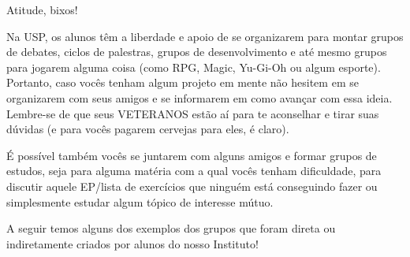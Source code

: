 \begin{secao}{Atitude, bixos!}

Na USP, os alunos têm a liberdade e apoio de se organizarem
para montar grupos de debates, ciclos de palestras, grupos
de desenvolvimento e até mesmo grupos para jogarem alguma coisa (como
RPG, Magic, Yu-Gi-Oh ou algum esporte).
Portanto, caso vocês tenham algum projeto em mente não hesitem
em se organizarem com seus amigos e se informarem em como avançar com essa
ideia. Lembre-se de que seus VETERANOS estão aí para te aconselhar e tirar suas
dúvidas (e para vocês pagarem cervejas para eles, é claro).

É possível também vocês se juntarem com alguns amigos e formar grupos de
estudos, seja para alguma matéria com a qual vocês tenham dificuldade, para
discutir aquele EP/lista de exercícios que ninguém está conseguindo
fazer ou simplesmente estudar algum tópico de interesse mútuo.

A seguir temos alguns dos exemplos dos grupos que foram direta ou indiretamente
criados por alunos do nosso Instituto!






























\end{secao}
